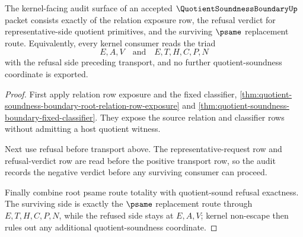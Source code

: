 \begin{theorem}
\label{thm:quotient-soundness-boundary-kernel-consumer-audit-triad}
The kernel-facing audit surface of an accepted $\QuotientSoundnessBoundaryUp$ packet consists exactly of the relation exposure row, the refusal verdict for representative-side quotient primitives, and the surviving $\psame$ replacement route. Equivalently, every kernel consumer reads the triad
$$
E,A,V \quad\text{and}\quad E,T,H,C,P,N
$$
with the refusal side preceding transport, and no further quotient-soundness coordinate is exported.
\end{theorem}
\begin{proof}
First apply relation row exposure and the fixed classifier, \autoref{thm:quotient-soundness-boundary-root-relation-row-exposure} and \autoref{thm:quotient-soundness-boundary-fixed-classifier}. They expose the source relation and classifier rows without admitting a host quotient witness.

Next use refusal before transport above. The representative-request row and refusal-verdict row are read before the positive transport row, so the audit records the negative verdict before any surviving consumer can proceed.

Finally combine root psame route totality with quotient-sound refusal exactness. The surviving side is exactly the $\psame$ replacement route through $E,T,H,C,P,N$, while the refused side stays at $E,A,V$; kernel non-escape then rules out any additional quotient-soundness coordinate.
\end{proof}

